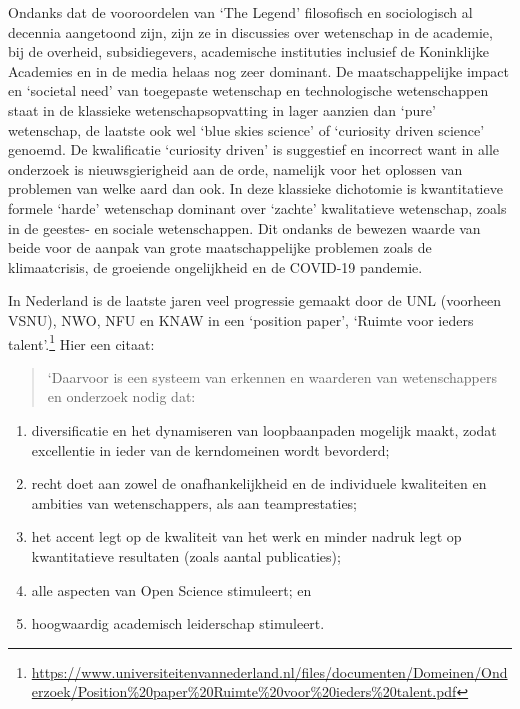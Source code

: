 \documentclass[empirical, authordate, ]{new-jote-article}
\begin{document}
	Ondanks dat de vooroordelen van ‘The Legend' filosofisch en sociologisch al decennia aangetoond zijn, zijn ze in discussies over wetenschap in de academie, bij de overheid, subsidiegevers, academische instituties inclusief de Koninklijke Academies en in de media helaas nog zeer dominant. De maatschappelijke impact en ‘societal need' van toegepaste wetenschap en technologische wetenschappen staat in de klassieke wetenschapsopvatting in lager aanzien dan ‘pure' wetenschap, de laatste ook wel ‘blue skies science' of ‘curiosity driven science' genoemd. De kwalificatie ‘curiosity driven' is suggestief en incorrect want in alle onderzoek is nieuwsgierigheid aan de orde, namelijk voor het oplossen van problemen van welke aard dan ook. In deze klassieke dichotomie is kwantitatieve formele ‘harde' wetenschap dominant over ‘zachte' kwalitatieve wetenschap, zoals in de geestes- en sociale wetenschappen. Dit ondanks de bewezen waarde van beide voor de aanpak van grote maatschappelijke problemen zoals de klimaatcrisis, de groeiende ongelijkheid en de COVID-19 pandemie.



	In Nederland is de laatste jaren veel progressie gemaakt door de UNL (voorheen VSNU), NWO, NFU en KNAW in een ‘position paper', ‘Ruimte voor ieders talent'.\footnote{\href{https://www.universiteitenvannederland.nl/files/documenten/Domeinen/Onderzoek/Position\%20paper\%20Ruimte\%20voor\%20ieders\%20talent.pdf}{https://www.universiteitenvannederland.nl/files/documenten/Domeinen/Onderzoek/Position\%20paper\%20Ruimte\%20voor\%20ieders\%20talent.pdf}} Hier een citaat:

	\begin{quote}
		\itshape

		‘Daarvoor is een systeem van erkennen en waarderen van wetenschappers en onderzoek nodig dat:
	\end{quote}
	\begin{enumerate}


		\item diversificatie en het dynamiseren van loopbaanpaden mogelijk maakt, zodat excellentie in ieder van de kerndomeinen wordt bevorderd;



		\item recht doet aan zowel de onafhankelijkheid en de individuele kwaliteiten en ambities van wetenschappers, als aan teamprestaties;



		\item het accent legt op de kwaliteit van het werk en minder nadruk legt op kwantitatieve resultaten (zoals aantal publicaties);



		\item alle aspecten van Open Science stimuleert; en



		\item hoogwaardig academisch leiderschap stimuleert.


	\end{enumerate}
\end{document}
